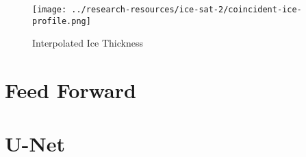 \begin{figure}[h!]
	\centering
	\texttt{[image: ../research-resources/ice-sat-2/coincident-ice-profile.png]}
	\caption{Interpolated Ice Thickness}
	\label{fig:ice-thickness-interpolation}
\end{figure}

\section {Feed Forward}

\cite{BASHA2020112}
\cite{jernelv2020convolutional}

\section {U-Net}